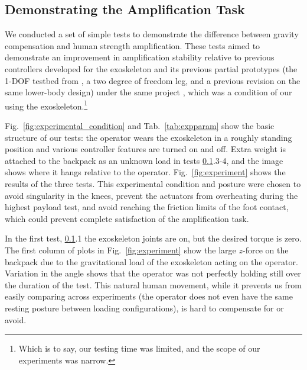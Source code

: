 \documentclass[utf8]{frontiersSCNS}
\renewcommand*{\cite}[1]{\citep{#1}}
\newcommand{\add}[1]{\textcolor[HTML]{8710b3}{#1}}
\begin{document}
\subsection{Demonstrating the Amplification Task}\label{subs:amp}
We conducted a set of simple tests to demonstrate the difference between gravity compensation and human strength amplification. These tests aimed to demonstrate an improvement in amplification stability relative to previous controllers developed for the exoskeleton and its previous partial prototypes (the 1-DOF testbed from \cite{HeThomasPaineSentis2019ACC,ThomasCoholichSentis2019AIM}, a two degree of freedom leg, and a previous revision on the same lower-body design) under the same project \cite{Campbell2018Thesis}, which was a condition of our using the exoskeleton.\footnote{Which is to say, our testing time was limited, and the scope of our experiments was narrow.} 

Fig.~\ref{fig:experimental_condition} and Tab.~\ref{tab:expparam} show the basic structure of our tests: the operator wears the exoskeleton in a roughly standing position and various controller features are turned on and off. Extra weight is attached to the backpack as an unknown load in tests \ref{subs:amp}.3-4, and the image shows where it hangs relative to the operator. Fig.~\ref{fig:experiment} shows the results of the three tests. \add{This experimental condition and posture were chosen to avoid singularity in the knees, prevent the actuators from overheating during the highest payload test, and avoid reaching the friction limits of the foot contact, which could prevent complete satisfaction of the amplification task.}

 

In the first test, \ref{subs:amp}.1 the exoskeleton joints are on, but the desired torque is zero. The first column of plots in Fig.~\ref{fig:experiment} show the large $z$-force on the backpack due to the gravitational load of the exoskeleton acting on the operator. Variation in the angle shows that the operator was not perfectly holding still over the duration of the test.
This natural human movement, while it prevents us from easily comparing across experiments (the operator does not even have the same resting posture between loading configurations), is hard to compensate for or avoid.
\end{document}

